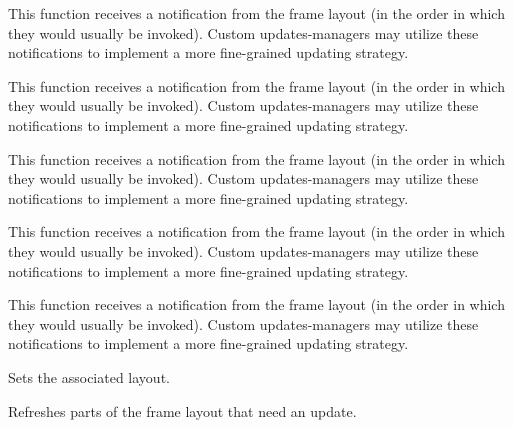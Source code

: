 This function receives a notification from the frame layout (in the order in which
they would usually be invoked). Custom updates-managers may utilize
these notifications to implement a more fine-grained updating strategy.


\label{cbupdatesmanagerbaseonpanemarginswillchange}


This function receives a notification from the frame layout (in the order in which
they would usually be invoked). Custom updates-managers may utilize
these notifications to implement a more fine-grained updating strategy.


\label{cbupdatesmanagerbaseonpanewillchange}


This function receives a notification from the frame layout (in the order in which
they would usually be invoked). Custom updates-managers may utilize
these notifications to implement a more fine-grained updating strategy.


\label{cbupdatesmanagerbaseonrowwillchange}


This function receives a notification from the frame layout (in the order in which
they would usually be invoked). Custom updates-managers may utilize
these notifications to implement a more fine-grained updating strategy.


\label{cbupdatesmanagerbaseonstartchanges}


This function receives a notification from the frame layout (in the order in which
they would usually be invoked). Custom updates-managers may utilize
these notifications to implement a more fine-grained updating strategy.


\label{cbupdatesmanagerbasesetlayout}


Sets the associated layout.


\label{cbupdatesmanagerbaseupdatenow}


Refreshes parts of the frame layout that need an update.

